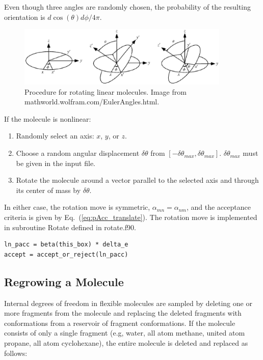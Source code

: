 Even though three angles are randomly chosen, the probability of the resulting orientation is $d\cos(\theta)d\phi/4\pi$.

\begin{figure}[h]
	\centering
	\includegraphics[width=0.9\textwidth]{EulerAngles.eps}
	\caption{Procedure for rotating linear molecules. \newline Image from mathworld.wolfram.com/EulerAngles.html.}
	\label{fig:EulerAngles}
\end{figure}

If the molecule is nonlinear:

\begin{enumerate}
	\item Randomly select an axis: $x$, $y$, or $z$.
	\item Choose a random angular displacement $\delta \theta$ from $[-\delta \theta_{max}, \delta \theta_{max}]$. $\delta \theta_{max}$ must be given in the input file.
	\item Rotate the molecule around a vector parallel to the selected axis and through its center of mass by $\delta \theta$.
\end{enumerate}

In either case, the rotation move is symmetric, $\alpha_{mn} = \alpha_{nm}$, and the acceptance criteria is given by Eq.\ (\ref{eq:pAcc_translate}). The rotation move is implemented in subroutine Rotate defined in rotate.f90.

\begin{lstlisting}[firstnumber=261, caption=rotate.f90, label=code:rotate]
ln_pacc = beta(this_box) * delta_e
accept = accept_or_reject(ln_pacc)
\end{lstlisting}

\subsection{Regrowing a Molecule}
\label{sec:regrow}
Internal degrees of freedom in flexible molecules are sampled by deleting one or more fragments from the molecule and replacing the deleted fragments with conformations from a reservoir of fragment conformations. If the molecule consists of only a single fragment (e.g, water, all atom methane, united atom propane, all atom cyclohexane), the entire molecule is deleted and replaced as follows:

